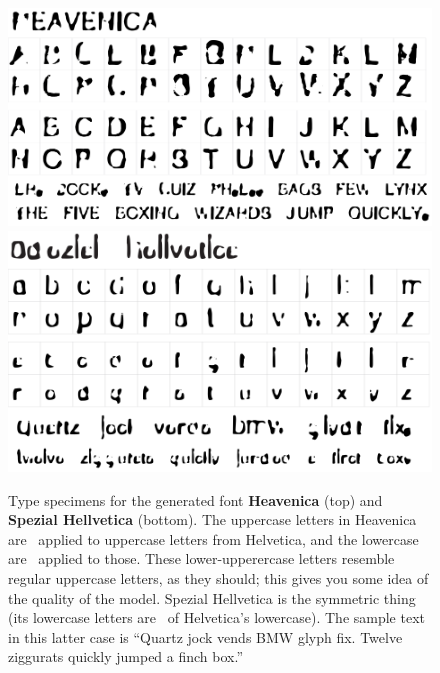 \documentclass[twocolumn]{article}
\begin{document}
\begin{figure}[tp]
\centering
\includegraphics[width=0.9 \linewidth]{heavenica} \\[0.5in]
\includegraphics[width=0.9 \linewidth]{spezialhellvetica} \\
\caption{
  Type specimens for the generated font {\bf Heavenica} (top)
  and {\bf Spezial Hellvetica} (bottom). The uppercase letters
  in Heavenica are \makeuppercase\ applied to uppercase letters
  from Helvetica, and the lowercase are \makelowercase\ applied
  to those. These lower-upperercase letters resemble regular
  uppercase letters, as they should; this gives you some idea
  of the quality of the model. Spezial Hellvetica is the
  symmetric thing (its lowercase letters are \makelowercase\
  of Helvetica's lowercase). The sample text in this latter
  case is ``Quartz jock vends BMW glyph fix. Twelve ziggurats
  quickly jumped a finch box.''
} \label{fig:heavenica}
\end{figure}
\end{document}
